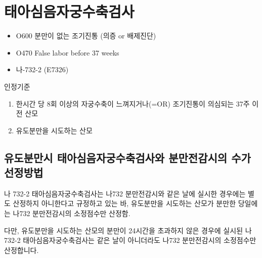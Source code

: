 \section{태아심음자궁수축검사}
\begin{paracol}{2}
\setlength{\columnseprule}{0.4pt}
\setlength{\columnsep}{2em}
\begin{leftcolumn}
\begin{commentbox}{}
\begin{itemize}\tightlist
\item[\dsjuridical] O600 분만이 없는 조기진통 (의증 or 배제진단)
\item[\dsjuridical] O470 False labor before 37 weeks
\item[\dsmedical] 나-732-2 (E7326)
\end{itemize}
\end{commentbox}

\end{leftcolumn}

\begin{rightcolumn}
인정기준 
\begin{enumerate}[가.]\tightlist
\item 한시간 당 8회 이상의 자궁수축이 느껴지거나(=OR) 조기진통이 의심되는 37주 이전 산모
\item 유도분만을 시도하는 산모
\end{enumerate}
\end{rightcolumn}
\end{paracol} 
\prezi{\clearpage}
\subsection{유도분만시 태아심음자궁수축검사와 분만전감시의 수가선정방법}
나 732-2 태아심음자궁수축검사는 나732 분만전감시와 같은 날에 실시한 경우에는 별도 산정하지 아니한다고 규정하고 있는 바, 유도분만을 시도하는 산모가 분만한 당일에는 나732 분만전감시의 소정점수만 산정함.\par
다만, 유도분만을 시도하는 산모의 분만이 24시간을 초과하지 않은 경우에 실시된 나732-2 태아심음자궁수축검사는 같은 날이 아니더라도 나732 분만전감시의 소정점수만 산정합니다.\par

